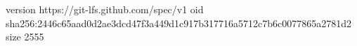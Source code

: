 version https://git-lfs.github.com/spec/v1
oid sha256:2446c65aad0d2ae3dcd47f3a449d1c917b317716a5712c7b6c0077865a2781d2
size 2555
